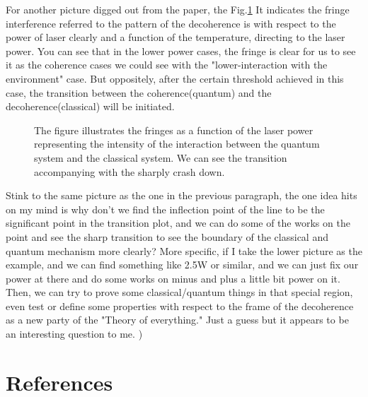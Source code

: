 \documentclass[final,1p,12pt]{elsarticle}
\begin{document}
For another picture digged out from the paper, the Fig.\ref{444} It indicates the fringe interference referred to the pattern of the decoherence is with respect to the power of laser clearly and a function of the temperature, directing to the laser power. You can see that in the lower power cases, the fringe is clear for us to see it as the coherence cases we could see with the "lower-interaction with the environment" case. But oppositely, after the certain threshold achieved in this case, the transition between the coherence(quantum) and the decoherence(classical) will be initiated.\\ 
\begin{figure}
\begin{center}
\end{center}
\caption{The figure illustrates the fringes as a function of the laser power representing the intensity of the interaction between the quantum system and the classical system. We can see the transition accompanying with the sharply crash down.}
\label{444}
\end{figure}

Stink to the same picture as the one in the previous paragraph, the one idea hits on my mind is why don't we find the inflection point of the line to be the significant point in the transition plot, and we can do some of the works on the point and see the sharp transition to see the boundary of the classical and quantum mechanism more clearly? More specific, if I take the lower picture as the example, and we can find something like 2.5W or similar, and we can just fix our power at there and do some works on minus and plus a little bit power on it. Then, we can try to prove some classical/quantum things in that special region, even test or define some properties with respect to the frame of the decoherence as a new party of the "Theory of everything." Just a guess but it appears to be an interesting question to me. )\\





\newpage
\section*{References}


\def\bibname{\Large\bf References}
\def\refname{\Large\bf References}
\pagestyle{plain}

\end{document}
